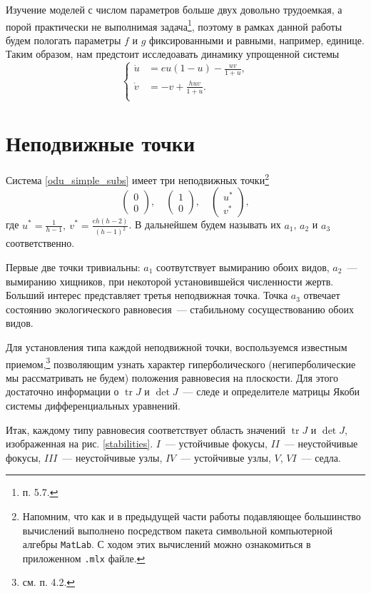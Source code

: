 \documentclass[oneside,final,12pt]{article}
\DeclareMathOperator{\tr}{tr}
\newcommand*\point[2]{\begin{pmatrix} #1 \\ #2 \end{pmatrix}}
\theoremstyle{plain}
\theoremstyle{remark}
\theoremstyle{definition}
\theoremstyle{plain}
\begin{document}
{	Изучение моделей с числом параметров больше двух довольно трудоемкая, а порой практически не выполнимая задача\footnote{\cite{DSMB} п. 5.7.}, поэтому в рамках данной работы будем пологать параметры \(f\) и \(g\) фиксированными и равными, например, единице.
	Таким образом, нам предстоит исследоавать динамику упрощенной системы 
		\begin{equation}\label{odu_simple_subs}
			\left\{ \begin{aligned}
				\dot u & = eu(1-u) - \frac{uv}{1+u},\\
				\dot v & = -v        + \frac{huv}{1+u}.	\\
			\end{aligned}\right.
		\end{equation}

		}

	\section{Неподвижные точки}
		Система \eqref{odu_simple_subs} имеет три неподвижных точки\footnote{Напомним, что как и в предыдущей части работы подавляющее большинство вычислений выполнено посредством пакета символьной компьютерной алгебры \texttt{MatLab}. С ходом этих вычислений можно ознакомиться в приложенном \texttt{.mlx} файле.}
		\[\point{0}{0}, \quad \point{1}{0}, \quad \point{u^*}{v^*},\]
где \(\displaystyle{u^* =\frac{1}{h-1},\: v^* = \frac{eh(h-2)}{(h-1)^2}}\). В дальнейшем будем называть их \(a_1\), \(a_2\) и \(a_3\) соответственно. 

	\bigskip
		Первые две точки тривиальны: \(a_1\) соотвутствует вымиранию обоих видов, \(a_2\)~--- вымиранию хищников, при некоторой установившейся численности жертв. Больший интерес представляет третья неподвижная точка. Точка \(a_3\) отвечает состоянию экологического равновесия~--- стабильному сосуществованию обоих видов.
	
	\bigskip
		Для установления типа каждой неподвижной точки, воспользуемся известным приемом,\footnote{см. \cite{DSMB} п. 4.2.} позволяющим узнать характер гиперболического (негиперболические мы рассматривать не будем) положения равновесия на плоскости. Для этого достаточно информации о \(\tr J\) и \(\det J\)~--- следе и определителе матрицы Якоби системы дифференциальных уравнений.
		
		Итак, каждому типу равновесия соответствует область значений \(\tr J\) и \(\det J\), изображенная на рис. \ref{stabilities}. \(I\)~--- устойчивые фокусы, \(II\)~--- неустойчивые фокусы, \(III\)~--- неустойчивые узлы, \(IV\)~--- устойчивые узлы, \(V\), \(VI\)~--- седла.
\end{document}
